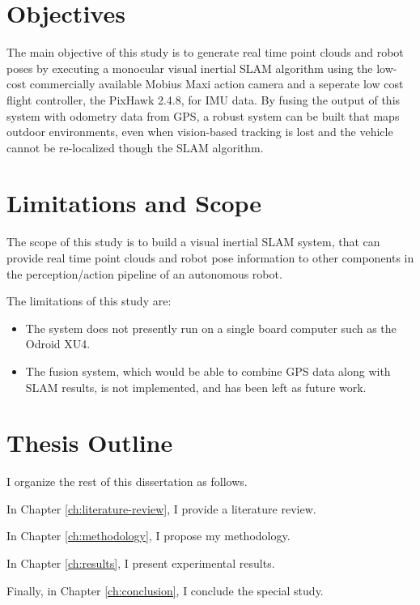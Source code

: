 \section{Objectives}

The main objective of this study is to generate real time point clouds and robot poses by executing a monocular visual inertial SLAM algorithm using the low-cost commercially available Mobius Maxi action camera and a seperate low cost flight controller, the PixHawk 2.4.8, for IMU data. By fusing the output of this system with odometry data from GPS, a robust system can be built that maps outdoor environments, even when vision-based tracking is lost and the vehicle cannot be re-localized though the SLAM algorithm.

\section{Limitations and Scope}

The scope of this study is to build a visual inertial SLAM system, that can provide real time point clouds and robot pose information to other components in the perception/action pipeline of an autonomous robot.

The limitations of this study are:

\begin{itemize}
	\item The system does not presently run on a single board computer such as the Odroid XU4. 
	\item The fusion system, which would be able to combine GPS data along with SLAM results, is not implemented, and has been left as future work.
\end{itemize}

\section{Thesis Outline}

I organize the rest of this dissertation as follows.

In Chapter \ref{ch:literature-review}, I provide a literature review.

In Chapter \ref{ch:methodology}, I propose my methodology.

In Chapter \ref{ch:results}, I present experimental results.

Finally, in Chapter \ref{ch:conclusion}, I conclude the special study.

\FloatBarrier
